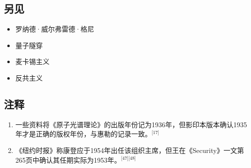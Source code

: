 \subsection{另见}
\begin{itemize}
\item 罗纳德·威尔弗雷德·格尼
\item 量子隧穿
\item 麦卡锡主义
\item 反共主义
\end{itemize}
\subsection{注释}
\begin{enumerate}
\item 一些资料将《原子光谱理论》的出版年份记为1936年，但影印本版本确认1935年才是正确的版权年份，与惠勒的记录一致。\(^\text{[17]}\)
\item 《纽约时报》称康登应于1954年出任该组织主席，但王在《Security》一文第265页中确认其任期实际为1953年。\(^\text{[47][48]}\)
\end{enumerate}
